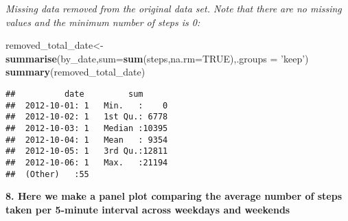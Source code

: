 \documentclass[]{article}
\newenvironment{Shaded}{\begin{snugshade}}{\end{snugshade}}
\newcommand{\DataTypeTok}[1]{\textcolor[rgb]{0.13,0.29,0.53}{#1}}
\newcommand{\KeywordTok}[1]{\textcolor[rgb]{0.13,0.29,0.53}{\textbf{#1}}}
\newcommand{\NormalTok}[1]{#1}
\newcommand{\OtherTok}[1]{\textcolor[rgb]{0.56,0.35,0.01}{#1}}
\newcommand{\StringTok}[1]{\textcolor[rgb]{0.31,0.60,0.02}{#1}}
\begin{document}
\emph{Missing data removed from the original data set. Note that there
are no missing values and the minimum number of steps is 0:}

\begin{Shaded}
\begin{Highlighting}[]
\NormalTok{removed_total_date<-}\KeywordTok{summarise}\NormalTok{(by_date,}\DataTypeTok{sum=}\KeywordTok{sum}\NormalTok{(steps,}\DataTypeTok{na.rm=}\OtherTok{TRUE}\NormalTok{),}\DataTypeTok{.groups =} \StringTok{'keep'}\NormalTok{)}
\KeywordTok{summary}\NormalTok{(removed_total_date)}
\end{Highlighting}
\end{Shaded}

\begin{verbatim}
##          date         sum       
##  2012-10-01: 1   Min.   :    0  
##  2012-10-02: 1   1st Qu.: 6778  
##  2012-10-03: 1   Median :10395  
##  2012-10-04: 1   Mean   : 9354  
##  2012-10-05: 1   3rd Qu.:12811  
##  2012-10-06: 1   Max.   :21194  
##  (Other)   :55
\end{verbatim}

\textbf{8. Here we make a panel plot comparing the average number of
steps taken per 5-minute interval across weekdays and weekends}
\end{document}
